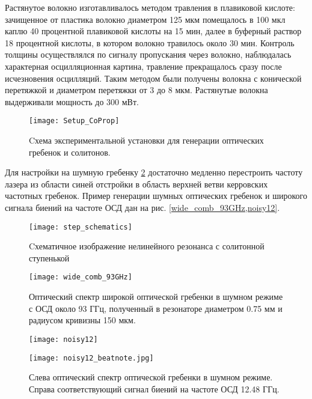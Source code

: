 Растянутое волокно изготавливалось методом травления в плавиковой кислоте: зачищенное от пластика волокно диаметром 125 мкм помещалось в 100 мкл каплю 40 процентной плавиковой кислоты на 15 мин, далее в буферный раствор 18 процентной кислоты, в котором волокно травилось около 30 мин. Контроль толщины осуществлялся по сигналу пропускания через волокно, наблюдалась характерная осцилляционная картина, травление прекращалось сразу после исчезновения осцилляций. Таким методом были получены волокна с конической перетяжкой и диаметром перетяжки от 3 до 8 мкм. Растянутые волокна выдерживали мощность до 300 мВт.

\begin{figure}[ht]
\centering
  \texttt{[image: Setup\_CoProp]}
  \caption{Cхема экспериментальной установки для генерации оптических гребенок и солитонов.}
  \label{Setup_CoProp}
\end{figure}

Для настройки на шумную гребенку \ref{step_schematics} достаточно медленно перестроить частоту лазера из области синей отстройки в область верхней ветви керровских частотных гребенок. Пример генерации шумных оптических гребенок и широкого сигнала биений на частоте ОСД дан на рис. \ref{wide_comb_93GHz,noisy12}.

\begin{figure}[ht]
\centering
  \texttt{[image: step\_schematics]}
  \caption{Cхематичное изображение нелинейного резонанса с солитонной ступенькой}
  \label{step_schematics}
\end{figure}

\begin{figure}[ht]
\centering
  \texttt{[image: wide\_comb\_93GHz]}
  \caption{Оптический спектр широкой оптической гребенки в шумном режиме с ОСД около 93 ГГц, полученный в резонаторе диаметром 0.75 мм и радиусом кривизны 150 мкм.}
  \label{wide_comb_93GHz}
\end{figure}

\begin{figure}[ht]
  \begin{minipage}[ht]{0.49\linewidth}\centering
    \texttt{[image: noisy12]}
  \end{minipage}
  \hfill
  \begin{minipage}[ht]{0.49\linewidth}\centering
    \texttt{[image: noisy12\_beatnote.jpg]}
  \end{minipage}
  \caption{Слева оптический спектр оптической гребенки в шумном режиме. Справа соответствующий сигнал биений на частоте ОСД 12.48 ГГц.}
  \label{noisy12}
\end{figure}

